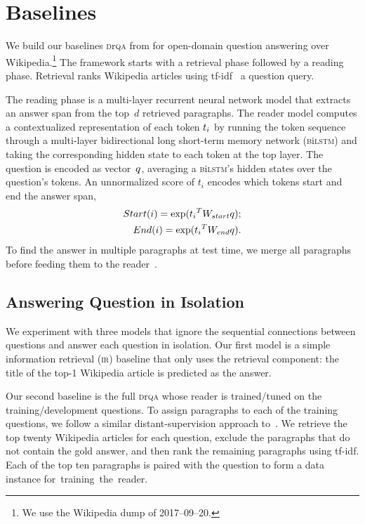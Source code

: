 \section{Baselines\label{sec:baselines}}


We build our baselines \textsc{d}r\textsc{qa} from
 for open-domain question answering over
Wikipedia.\footnote{We use the Wikipedia dump of 2017--09--20.} The
framework starts with a retrieval phase followed by a reading phase.
Retrieval ranks Wikipedia articles using tf-idf~\cite{salton1987term} a question query.

The reading phase is a multi-layer recurrent neural network model
that extracts an answer span from the top~$d$ retrieved paragraphs.
The reader model computes a contextualized representation of each token $\*{t_i}$
by running the token sequence through a multi-layer bidirectional
long short-term memory network (\textsc{b}i\textsc{lstm}) \cite{hochreiter1997long}  and
taking the corresponding hidden state to each token at the top layer.
The question is encoded as vector~$\*q$, averaging a
\textsc{b}i\textsc{lstm}'s hidden states over the question's
tokens. An unnormalized score of $t_i$
encodes which tokens start and end the answer span,
\begin{eqnarray}
Start(i) = \exp(\*{t_i}^T\*{W_{start}}\*q);\nonumber\\
End(i) = \exp(\*{t_i}^T\*{W_{end}}\*q).
\label{eq:scores}
\end{eqnarray}
To find the answer in multiple paragraphs at test time,
we merge all  paragraphs
before feeding them to the reader~\cite{clark2018simple}.


\subsection{Answering Question in Isolation}
We experiment with three models that ignore the sequential connections
between questions and answer each question in isolation.
Our first model is a simple information retrieval (\textsc{ir}) baseline that only
uses the retrieval component: the title of the
top-1 Wikipedia article is predicted as the answer.

Our second baseline
is the full \textsc{d}r\textsc{qa} whose reader is trained/tuned on the
training/development questions.
To assign paragraphs to each of the training questions, we follow a similar
distant-supervision approach to~\citet{chen2017reading}. We retrieve
the top twenty Wikipedia articles for each question, exclude the paragraphs that
do not contain the gold answer, and then rank the remaining paragraphs
using tf-idf. Each of the top ten paragraphs is paired with the question
to form a data instance for~training~the~reader.


